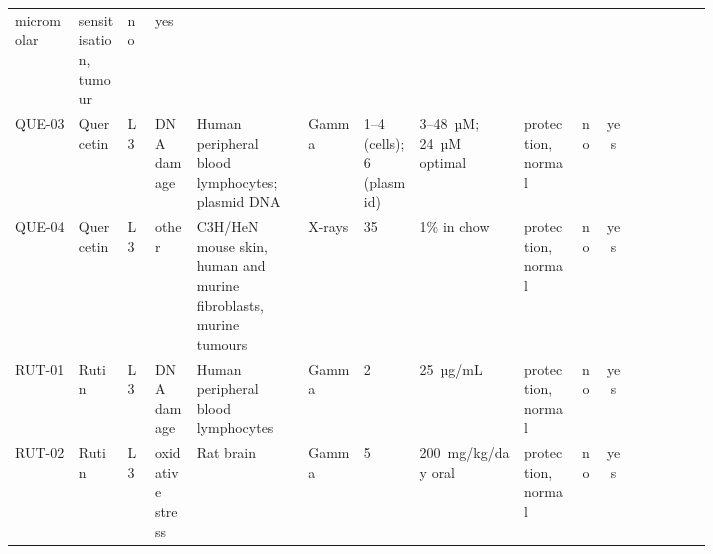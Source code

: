 \begin{landscape}
\begin{longtable}{@{}l L{0.075\linewidth} l L{0.065\linewidth} L{0.16\linewidth}
    L{0.085\linewidth} L{0.085\linewidth} L{0.15\linewidth} L{0.08\linewidth} c c
    L{0.11\linewidth}@{}}
      micromolar & sensitisation, tumour & no & yes &  \\
  QUE-03 & Quercetin & L3 & DNA damage & Human peripheral blood lymphocytes; plasmid DNA
    & Gamma & 1--4 (cells); 6 (plasmid) & 3--48~µM; 24~µM optimal & protection, normal & no
    & yes &  \\
  QUE-04 & Quercetin & L3 & other & C3H/HeN mouse skin, human and murine fibroblasts, murine
      tumours & X-rays & 35 & 1\% in chow & protection, normal & no & yes
    &  \\
  RUT-01 & Rutin & L3 & DNA damage & Human peripheral blood lymphocytes & Gamma & 2
    & 25~µg/mL & protection, normal & no & yes &  \\
  RUT-02 & Rutin & L3 & oxidative stress & Rat brain & Gamma & 5 & 200~mg/kg/day oral
    & protection, normal & no & yes &  \\
\end{longtable}
\endgroup
\end{landscape}

